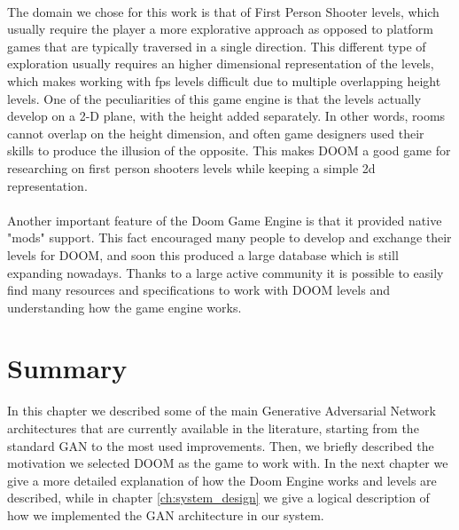 \paragraph{} The domain we chose for this work is that of First Person Shooter levels, which usually require the player a more explorative approach as opposed to platform games that are typically traversed in a single direction. This different type of exploration usually requires an higher dimensional representation of the levels, which makes working with fps levels difficult due to multiple overlapping height levels. One of the peculiarities of this game engine is that the levels actually develop on a 2-D plane, with the height added separately. In other words, rooms cannot overlap on the height dimension, and often game designers used their skills to produce the illusion of the opposite. This makes DOOM a good game for researching on first person shooters levels while keeping a simple 2d representation. 

\paragraph{} Another important feature of the Doom Game Engine is that it provided native "mods" support. This fact encouraged many people to develop and exchange their levels for DOOM, and soon this produced a large database which is still expanding nowadays. Thanks to a large active community it is possible to easily find many resources and specifications to work with DOOM levels and understanding how the game engine works.

\section{Summary}
In this chapter we described some of the main Generative Adversarial Network architectures that are currently available in the literature, starting from the standard GAN to the most used improvements. Then, we briefly described the motivation we selected DOOM as the game to work with. In the next chapter we give a more detailed explanation of how the Doom Engine works and levels are described, while in chapter \ref{ch:system_design} we give a logical description of how we implemented the GAN architecture in our system. 